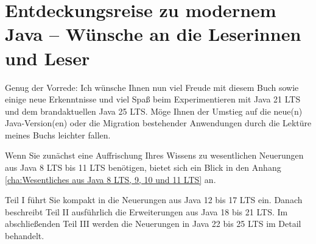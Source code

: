 \section*{Entdeckungsreise zu modernem Java -- Wünsche an die Leserinnen und Leser}


Genug der Vorrede: Ich wünsche Ihnen nun viel Freude mit diesem Buch sowie einige neue
Erkenntnisse und viel Spaß beim Experimentieren mit Java 21 LTS und
 dem brandaktuellen Java 25 LTS.
Möge Ihnen der Umstieg auf die neue(n) Java-Version(en)  oder die Migration
bestehender Anwendungen  durch die Lektüre meines Buchs  leichter fallen.


Wenn Sie zunächst eine Auffrischung Ihres Wissens zu wesentlichen
Neuerungen aus Java 8 LTS bis 11 LTS benötigen, bietet sich ein Blick in den Anhang
\ref{cha:Wesentliches aus Java 8 LTS, 9, 10 und 11 LTS} an.


Teil I führt Sie kompakt in die Neuerungen aus Java 12 bis 17 LTS ein.
Danach beschreibt Teil II ausführlich die Erweiterungen aus Java 18 bis 21 LTS.
Im abschließenden Teil III werden die Neuerungen in Java 22 bis 25 LTS  im Detail behandelt.






